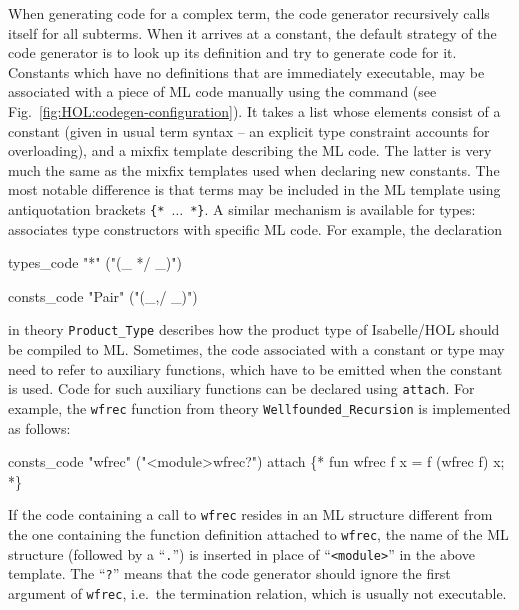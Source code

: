When generating code for a complex term, the code generator recursively
calls itself for all subterms.
When it arrives at a constant, the default strategy of the code
generator is to look up its definition and try to generate code for it.
Constants which have no definitions that
are immediately executable, may be associated with a piece of ML
code manually using the  command
(see Fig.~\ref{fig:HOL:codegen-configuration}).
It takes a list whose elements consist of a constant (given in usual term syntax
-- an explicit type constraint accounts for overloading), and a
mixfix template describing the ML code. The latter is very much the
same as the mixfix templates used when declaring new constants.
The most notable difference is that terms may be included in the ML
template using antiquotation brackets \verb|{*|~$\ldots$~\verb|*}|.
A similar mechanism is available for
types:  associates type constructors with
specific ML code. For example, the declaration
\begin{ttbox}
types_code
  "*"     ("(_ */ _)")

consts_code
  "Pair"    ("(_,/ _)")
\end{ttbox}
in theory \texttt{Product_Type} describes how the product type of Isabelle/HOL
should be compiled to ML. Sometimes, the code associated with a
constant or type may need to refer to auxiliary functions, which
have to be emitted when the constant is used. Code for such auxiliary
functions can be declared using \texttt{attach}. For example, the
\texttt{wfrec} function from theory \texttt{Wellfounded_Recursion}
is implemented as follows:
\begin{ttbox}
consts_code
  "wfrec"   ("\bs<module>wfrec?")
attach \{*
fun wfrec f x = f (wfrec f) x;
*\}
\end{ttbox}
If the code containing a call to \texttt{wfrec} resides in an ML structure
different from the one containing the function definition attached to
\texttt{wfrec}, the name of the ML structure (followed by a ``\texttt{.}'')
is inserted in place of ``\texttt{\bs<module>}'' in the above template.
The ``\texttt{?}'' means that the code generator should ignore the first
argument of \texttt{wfrec}, i.e.\ the termination relation, which is
usually not executable.

